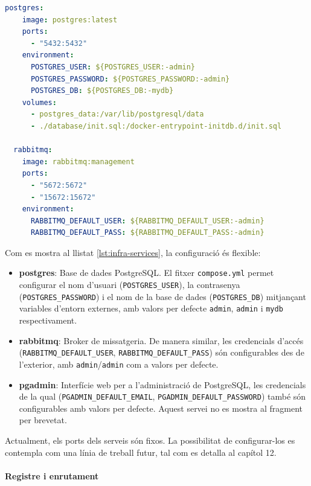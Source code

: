 \begin{lstlisting}[language=yaml, caption={Serveis d'infraestructura a compose.yml}, label={lst:infra-services}]
  postgres:
    image: postgres:latest
    ports:
      - "5432:5432"
    environment:
      POSTGRES_USER: ${POSTGRES_USER:-admin}
      POSTGRES_PASSWORD: ${POSTGRES_PASSWORD:-admin}
      POSTGRES_DB: ${POSTGRES_DB:-mydb}
    volumes:
      - postgres_data:/var/lib/postgresql/data
      - ./database/init.sql:/docker-entrypoint-initdb.d/init.sql

  rabbitmq:
    image: rabbitmq:management
    ports:
      - "5672:5672"
      - "15672:15672"
    environment:
      RABBITMQ_DEFAULT_USER: ${RABBITMQ_DEFAULT_USER:-admin}
      RABBITMQ_DEFAULT_PASS: ${RABBITMQ_DEFAULT_PASS:-admin}
\end{lstlisting}

Com es mostra al llistat \ref{lst:infra-services}, la configuració és flexible:

\begin{itemize}
    \item \textbf{postgres}: Base de dades PostgreSQL. El fitxer \texttt{compose.yml} permet configurar el nom d'usuari (\texttt{POSTGRES\_USER}), la contrasenya (\texttt{POSTGRES\_PASSWORD}) i el nom de la base de dades (\texttt{POSTGRES\_DB}) mitjançant variables d'entorn externes, amb valors per defecte \texttt{admin}, \texttt{admin} i \texttt{mydb} respectivament.
    
    \item \textbf{rabbitmq}: Broker de missatgeria. De manera similar, les credencials d'accés (\texttt{RABBITMQ\_DEFAULT\_USER}, \texttt{RABBITMQ\_DEFAULT\_PASS}) són configurables des de l'exterior, amb \texttt{admin}/\texttt{admin} com a valors per defecte.
    
    \item \textbf{pgadmin}: Interfície web per a l'administració de PostgreSQL, les credencials de la qual (\texttt{PGADMIN\_DEFAULT\_EMAIL}, \texttt{PGADMIN\_DEFAULT\_PASSWORD}) també són configurables amb valors per defecte. Aquest servei no es mostra al fragment per brevetat.
\end{itemize}

Actualment, els ports dels serveis són fixos. La possibilitat de configurar-los es contempla com una línia de treball futur, tal com es detalla al capítol 12.

\paragraph{Registre i enrutament}

